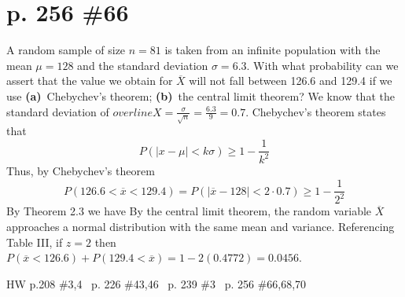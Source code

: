 \documentclass[12pt]{article}
\begin{document}
	\section[20pt]{p. 256 \#66}
	A random sample of size \(n = 81\) is taken from an infinite population with the mean \(\mu=128\) and the standard deviation \(\sigma=6.3\). With what probability can we assert that the value we obtain for \(\overline{X}\) will not fall between 126.6 and 129.4 if we use \newline
	\textbf{(a)}\ Chebychev's theorem; \newline
	\textbf{(b)}\ the central limit theorem? \newline \newline
	We know that the standard deviation of \(overline{X}=\frac{\sigma}{\sqrt{n}}=\frac{6.3}{9}=0.7\). \newline
	Chebychev's theorem states that
	\[P(|x-\mu|<k\sigma)\geq 1-\frac{1}{k^2}\]
	Thus, by Chebychev's theorem
	\[P(126.6<\overline{x}<129.4)=P(|\overline{x}-128|<2\cdot 0.7)\geq 1-\frac{1}{2^2}\]
	By Theorem 2.3 we have \newline
	 \newline \newline
	By the central limit theorem, the random variable \(\overline{X}\) approaches a normal distribution with the same mean and variance. \newline
	Referencing Table III, if \(z=2\) then \(P(\overline{x}<126.6)+P(129.4<\overline{x})=1-2(0.4772)=0.0456\).
	\newline
	\newpage
	\maketitle HW p.208 \#3,4 \ p. 226 \#43,46 \ p. 239 \#3 \ p. 256 \#66,68,70
\end{document}
